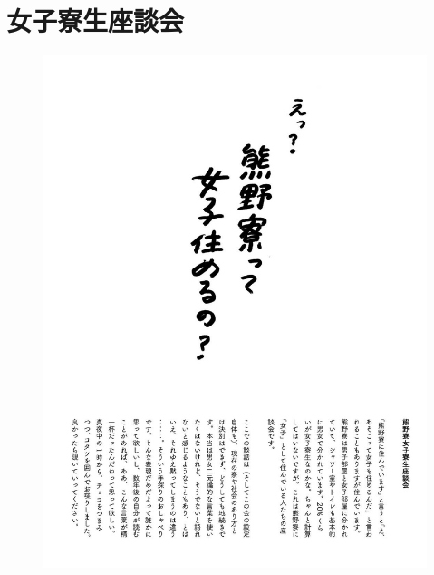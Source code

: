 
\sectionnotitle
\section{女子寮生座談会}\label{sec:josiryose}
\sectiondefault


\begin{figure}[H]
  \centering
  \includegraphics[width=18cm]{gazo/josiryose_title.jpg}
\end{figure}

\newpage


